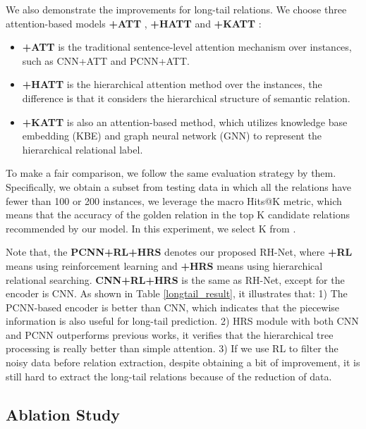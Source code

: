 \documentclass{article}
\begin{document}
We also demonstrate the improvements for long-tail relations. We choose three attention-based models \textbf{+ATT} \cite{Lin2016Neural}, \textbf{+HATT} \cite{han2018hierarchical} and \textbf{+KATT} \cite{zhang2019long-tail}:
\begin{itemize}
    \item \textbf{+ATT} is the traditional sentence-level attention mechanism over instances, such as CNN+ATT and PCNN+ATT\cite{Lin2016Neural}.
    
    \item \textbf{+HATT}  is the hierarchical attention method over the instances, the difference is that it considers the hierarchical structure of semantic relation.
    
    \item \textbf{+KATT} is also an attention-based method, which utilizes knowledge base embedding (KBE) and graph neural network (GNN) to represent the hierarchical relational label.
    
\end{itemize}
To make a fair comparison, we follow the same evaluation strategy by them. Specifically, we obtain a subset from testing data in which all the relations have fewer than 100 or 200 instances, we leverage the macro Hits@K metric, which means that the accuracy of the golden relation in the top K candidate relations recommended by our model. In this experiment, we select K from . 

Note that, the \textbf{PCNN+RL+HRS} denotes our proposed RH-Net, where \textbf{+RL} means using reinforcement learning and \textbf{+HRS} means using hierarchical relational searching. \textbf{CNN+RL+HRS} is the same as RH-Net, except for the encoder is CNN. As shown in Table \ref{longtail_result}, it illustrates that: 1) The PCNN-based encoder is better than CNN, which indicates that the piecewise information is also useful for long-tail prediction. 2) HRS module with both CNN and PCNN outperforms previous works, it verifies that the hierarchical tree processing is really better than simple attention. 3) If we use RL to filter the noisy data before relation extraction, despite obtaining a bit of improvement, it is still hard to extract the long-tail relations because of the reduction of data. 


\subsection{Ablation Study}
\end{document}
